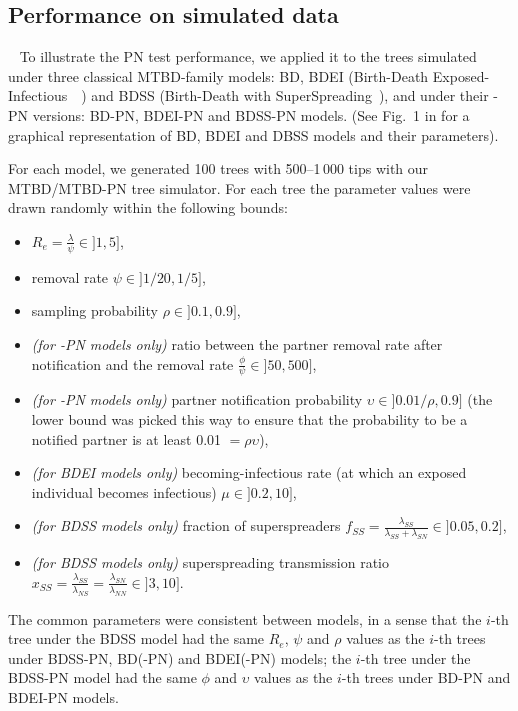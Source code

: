 \documentclass[a4paper,10pt]{article}
\begin{document}
\subsection{Performance on simulated data}~\label{sec:test:sim}
To illustrate the PN test performance, we applied it to the trees simulated under three classical MTBD-family models: BD, BDEI (Birth-Death Exposed-Infectious~~\citep{Stadler2014}) and BDSS (Birth-Death with SuperSpreading~\citep{Stadler2013a}), and under their -PN versions: BD-PN, BDEI-PN and BDSS-PN models. (See Fig.~1 in \citet{Voznica2021} for a graphical representation of BD, BDEI and DBSS models and their parameters).

For each model, we generated 100 trees with 500--1\,000 tips with our MTBD/MTBD-PN tree simulator. For each tree the parameter values were drawn randomly within the following bounds:
\begin{itemize}
\item $R_e = \frac{{\lambda}}{{\psi}} \in ]1, 5]$, 
\item removal rate $\psi \in ]1 / 20, 1 / 5]$,
\item sampling probability $\rho \in ]0.1, 0.9]$,
\item \textit{(for -PN models only)} ratio between the partner removal rate after notification and the removal rate $\frac{\phi}{\psi} \in ]50, 500]$,
\item \textit{(for -PN models only)} partner notification probability $\upsilon \in ]0.01/\rho, 0.9]$ (the lower bound was picked this way to ensure that the probability to be a notified partner is at least 0.01 $=\rho \upsilon$),
\item \textit{(for BDEI models only)} becoming-infectious rate (at which an exposed individual becomes infectious) $\mu \in ]0.2, 10]$,
\item \textit{(for BDSS models only)} fraction of superspreaders $f_{SS} = \frac{\lambda_{SS}}{\lambda_{SS} + \lambda_{SN}} \in ]0.05, 0.2]$,
\item \textit{(for BDSS models only)} superspreading transmission ratio $x_{SS} = \frac{\lambda_{SS}}{\lambda_{NS}} = \frac{\lambda_{SN}}{\lambda_{NN}} \in ]3, 10]$.
\end{itemize} 

The common parameters were consistent between models, in a sense that the $i$-th tree under the BDSS model had the same $R_e$, $\psi$ and $\rho$ values as the $i$-th trees under BDSS-PN, BD(-PN) and BDEI(-PN) models; the $i$-th tree under the BDSS-PN model had the same $\phi$ and $\upsilon$ values as the $i$-th trees under BD-PN and BDEI-PN models.
\end{document}
